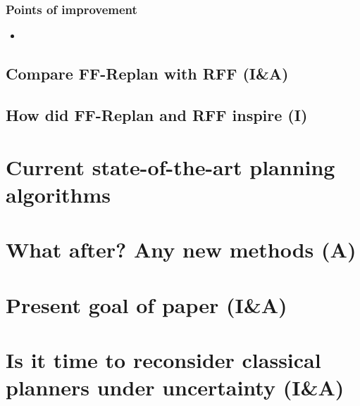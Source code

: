 \documentclass[runningheads,a4paper]{llncs}
\begin{document}
\subsubsection{Points of improvement}

\begin{itemize}
	\item
\end{itemize}

\subsection{Compare FF-Replan with RFF (I\&A)}

\subsection{How did FF-Replan and RFF inspire (I)}

\section{Current state-of-the-art planning algorithms}

\section{What after? Any new methods (A)}

\section{Present goal of paper (I\&A)}

\section{Is it time to reconsider classical planners under uncertainty (I\&A)}



\end{document}
